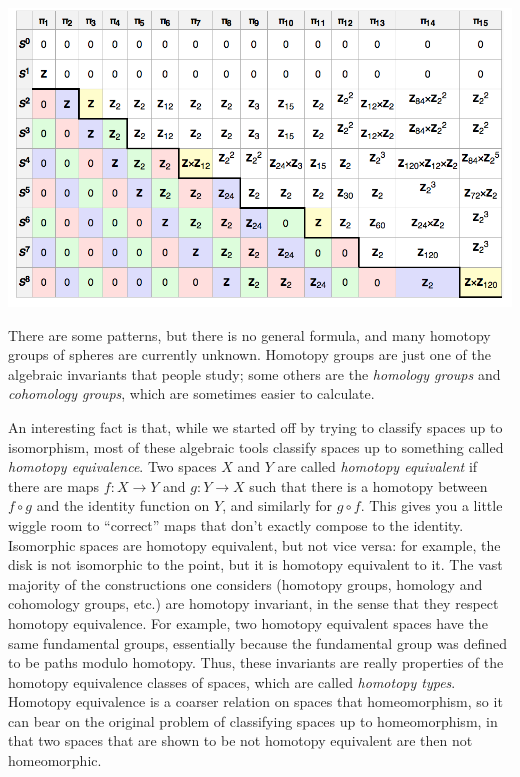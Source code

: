 \includegraphics[width=5.5in]{spheres.png}

There are some patterns, but there is no general formula, and many
homotopy groups of spheres are currently unknown.  Homotopy groups are
just one of the algebraic invariants that people study; some others are
the \emph{homology groups} and \emph{cohomology groups}, which are
sometimes easier to calculate.

An interesting fact is that, while we started off by trying to classify
spaces up to isomorphism, most of these algebraic tools classify
spaces up to something called \emph{homotopy equivalence}.  Two spaces $X$ and $Y$
are called {\em homotopy equivalent} if there are maps $f : X \rightarrow Y$ and $g : Y \rightarrow X$
such that there is a homotopy between $f \circ g$ and the identity function on $Y$,
and similarly for $g \circ f$.  This gives you a little wiggle room to
``correct'' maps that don't exactly compose to the identity.
Isomorphic spaces are homotopy
equivalent, but not vice versa: for example, the disk is not isomorphic
to the point, but it is homotopy equivalent to it.  The vast majority of
the constructions one considers (homotopy groups, homology and
cohomology groups, etc.) are homotopy invariant, in the sense that they
respect homotopy equivalence.  For example, two homotopy equivalent
spaces have the same fundamental groups, essentially because the
fundamental group was defined to be paths modulo homotopy.  Thus, these
invariants are really properties of the homotopy equivalence classes of
spaces, which are called \emph{homotopy types}.  Homotopy equivalence is a coarser
relation on spaces that homeomorphism, so it can bear 
                                                         on the original
problem of classifying spaces up to homeomorphism, in that two spaces
that are shown to be not homotopy equivalent are then not homeomorphic.

